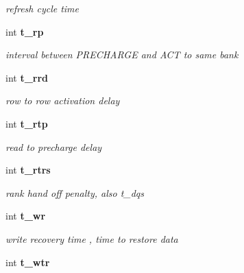 \begin{CompactItemize}
\begin{CompactList}\small\item\em refresh cycle time \item\end{CompactList}\item 
int {\bf t\_\-rp}\label{class_d_r_a_msim_i_i_1_1_timing_specification_7b4991ee22075889f88512d5b3c3e07e}

\begin{CompactList}\small\item\em interval between PRECHARGE and ACT to same bank \item\end{CompactList}\item 
int {\bf t\_\-rrd}\label{class_d_r_a_msim_i_i_1_1_timing_specification_e686c75e601392cb7bd0d7b38f680861}

\begin{CompactList}\small\item\em row to row activation delay \item\end{CompactList}\item 
int {\bf t\_\-rtp}\label{class_d_r_a_msim_i_i_1_1_timing_specification_f7e7bf9631df259ab4353a9df4acba39}

\begin{CompactList}\small\item\em read to precharge delay \item\end{CompactList}\item 
int {\bf t\_\-rtrs}\label{class_d_r_a_msim_i_i_1_1_timing_specification_f1987bd7569873f4ae6d7e848badab43}

\begin{CompactList}\small\item\em rank hand off penalty, also t\_\-dqs \item\end{CompactList}\item 
int {\bf t\_\-wr}\label{class_d_r_a_msim_i_i_1_1_timing_specification_145ae8d7a81753949886d4015a7a44de}

\begin{CompactList}\small\item\em write recovery time , time to restore data \item\end{CompactList}\item 
int {\bf t\_\-wtr}\label{class_d_r_a_msim_i_i_1_1_timing_specification_394dae9ddb5e304ff07d709c09c00e6a}


\end{CompactItemize}
